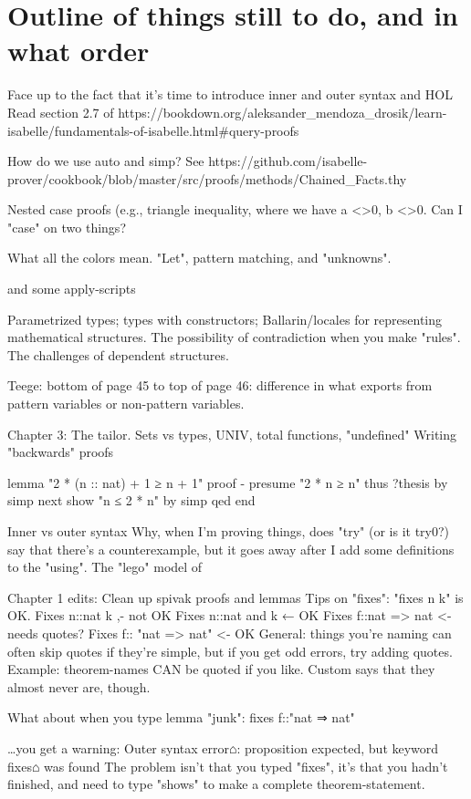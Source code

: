 
\chapter{Outline of things still to do, and in what order}
Face up to the fact that it's time to introduce inner and outer syntax and HOL
Read section 2.7 of https://bookdown.org/aleksander_mendoza_drosik/learn-isabelle/fundamentals-of-isabelle.html#query-proofs

How do we use auto and simp? See https://github.com/isabelle-prover/cookbook/blob/master/src/proofs/methods/Chained_Facts.thy

Nested case proofs (e.g., triangle inequality, where we have a <>0, b <>0. Can I "case" on two things? 

What all the colors mean. "Let", pattern matching, and "unknowns". 

and some apply-scripts


Parametrized types; types with constructors; Ballarin/locales for representing mathematical structures. The possibility of contradiction when you make "rules". The challenges of dependent structures.

Teege: bottom of page 45 to top of page 46: difference in what exports from pattern variables or non-pattern variables.



Chapter 3: The tailor. Sets vs types, UNIV, total functions, "undefined"
Writing "backwards" proofs

lemma "2 * (n :: nat) + 1 ≥ n + 1"
proof -
  presume "2 * n ≥ n"
   thus ?thesis
     by simp
next
   show "n ≤ 2 * n"
     by simp
qed
end



Inner vs outer syntax
Why, when I'm proving things, does "try" (or is it try0?) say that there's a counterexample, but it goes away after I add some definitions to the "using".
The "lego" model of 

Chapter 1 edits:
Clean up spivak proofs and lemmas
Tips on "fixes": "fixes n k" is OK. 
Fixes n::nat k ,- not OK
Fixes n::nat and k ← OK
Fixes f::nat => nat <- needs quotes? 
Fixes f:: "nat => nat" <- OK
General: things you're naming can often skip quotes if they're simple, but if you get odd errors, try adding quotes. Example: theorem-names CAN be quoted if you like. Custom says that they almost never are, though. 

What about when you type
lemma "junk":
  fixes f::"nat ⇒ nat"

…you get a warning: Outer syntax error⌂: proposition expected,
but keyword fixes⌂ was found
 The problem isn't that you typed "fixes", it's that you hadn't finished, and need to type "shows" to make a complete theorem-statement. 

